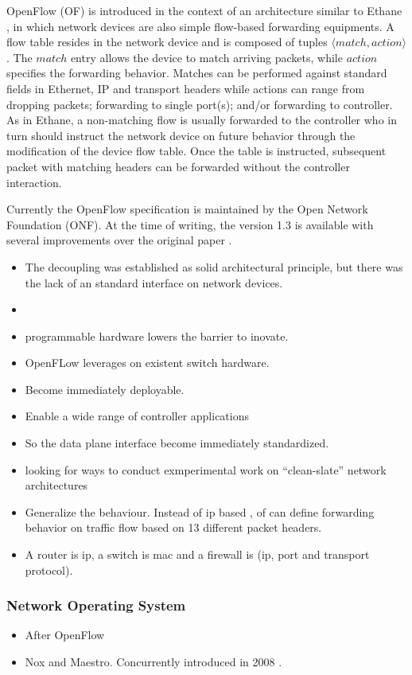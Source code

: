 \documentclass[12pt,openright,twoside]{report}
\begin{document}
\begin{itemize}
OpenFlow (OF) is introduced in the context of an architecture similar to
Ethane \cite{Casado:2007kb}, in which network devices 
are also simple flow-based forwarding equipments. A flow
table resides in the network device and is composed of tuples
$\langle match,action \rangle$. The $match$ entry allows the device to match
arriving packets, while  $action$
specifies the forwarding behavior. Matches can be performed against
standard fields in Ethernet, IP and transport headers while actions can
range from dropping packets; forwarding to single port(s); and/or forwarding to controller. As in Ethane, a non-matching flow is usually forwarded to the controller who in
turn should instruct  the network device on future behavior through
the modification of the device flow table. Once the table is instructed, 
subsequent packet with matching headers can be forwarded without
the controller interaction. 

Currently the OpenFlow specification is maintained by the Open Network
Foundation (ONF). At the time of writing, the version 1.3 \cite{of13} is available with
several improvements over the original paper \cite{openflow}. 

\begin{itemize}
\item The decoupling was established as solid architectural principle, but there was the lack of an standard interface on network devices. 
\item 
\item programmable hardware lowers the barrier to inovate. 
\item OpenFLow leverages on existent switch hardware. 
\item Become immediately deployable. 
\item  Enable a wide range of controller applications
\item So the data plane interface become immediately standardized. 
\item looking for ways to conduct exmperimental work on ``clean-slate'' network architectures 
\item Generalize the behaviour. Instead of ip based , \gls{of} can define forwarding behavior on traffic flow based on 13 different packet headers. 
\item A router is ip, a switch is mac and a firewall is (ip, port and transport protocol). 
\end{itemize}
\subsubsection{Network Operating System}
\begin{itemize}
\item After \gls{OpenFlow} 
\item Nox and Maestro. Concurrently introduced in 2008 . 


\end{itemize}
\end{itemize}
\end{document}
